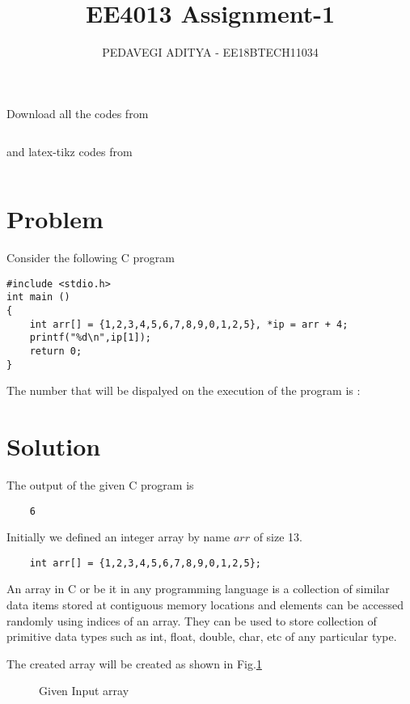 \documentclass[journal,12pt,twocolumn]{IEEEtran}
\begin{document}
\def\rightbox#1{\makebox[0in][r]{#1}}
\def\centbox#1{\makebox[0in]{#1}}
\def\topbox#1{\raisebox{-\baselineskip}[0in][0in]{#1}}
\def\midbox#1{\raisebox{-0.5\baselineskip}[0in][0in]{#1}}
\vspace{3cm}
\title{EE4013 Assignment-1}
\author{PEDAVEGI ADITYA - EE18BTECH11034}
\maketitle
\newpage
\bigskip
\renewcommand{\thefigure}{\theenumi}
\renewcommand{\thetable}{\theenumi}
Download all the codes from
\begin{lstlisting}

\end{lstlisting}
%
and latex-tikz codes from
%
\begin{lstlisting}

\end{lstlisting}
\section{Problem}
Consider the following C program
\begin{lstlisting}
#include <stdio.h>
int main ()
{
	int arr[] = {1,2,3,4,5,6,7,8,9,0,1,2,5}, *ip = arr + 4;
	printf("%d\n",ip[1]);
	return 0;
}

\end{lstlisting}
The number that will be dispalyed on the execution of the program is :
\section{Solution}
The output of the given C program is
\begin{lstlisting}
    6
\end{lstlisting}

Initially we defined an integer array by name $arr$ of size 13.
\begin{lstlisting}
    int arr[] = {1,2,3,4,5,6,7,8,9,0,1,2,5};
\end{lstlisting}


An array in C or be it in any programming language is a collection of
similar data items stored at contiguous memory locations and elements can be
accessed randomly using indices of an array. They can be used to store
collection of primitive data types such as int, float, double, char, etc of any
particular type.

The created array will be created as shown in Fig.\ref{fig:ee18btech11034_1}
\begin{figure}[!ht]
    \begin{center}
        \resizebox{\columnwidth}{!}{}
    \end{center}
    \caption{Given Input array}
    \label{fig:ee18btech11034_1}
\end{figure}
\end{document}
